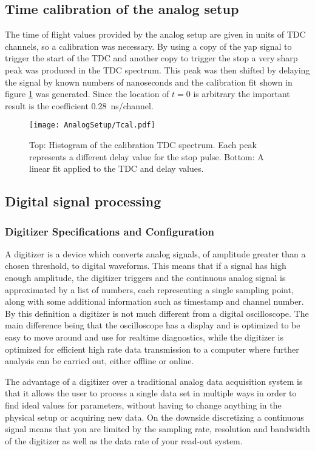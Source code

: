 \documentclass[main.tex]{subfiles}
\begin{document}
\subsection{Time calibration of the analog setup}
The time of flight values provided by the analog setup are given in units of TDC channels, so a calibration was necessary. By using a copy of the yap signal to trigger the start of the TDC and another copy to trigger the stop a very sharp peak was produced in the TDC spectrum.
This peak was then shifted by delaying the signal by known numbers of nanoseconds and the calibration fit shown in figure \ref{fig:Tcal} was generated. Since the location of $t=0$ is arbitrary the important result is the coefficient \SI{0.28}{\nano\second/channel}.
\begin{figure}[ht]
	\centering
    	\texttt{[image: AnalogSetup/Tcal.pdf]}
        \caption{Top: Histogram of the calibration TDC spectrum. Each peak represents a different delay value for the stop pulse. Bottom: A linear fit applied to the TDC and delay values.}
	    \label{fig:Tcal} 
\end{figure}

\subsection{Digital signal processing}
\subsubsection{Digitizer Specifications and Configuration}
A digitizer is a device which converts analog signals, of amplitude greater than a chosen threshold, to digital waveforms. This means that if a signal has high enough amplitude, the digitizer triggers and the continuous analog signal is approximated by a list of numbers, each representing a single sampling point, along with some additional information such as timestamp and channel number. By this definition a digitizer is not much different from a digital oscilloscope. The main difference being that the oscilloscope has a display and is optimized to be easy to move around and use for realtime diagnostics, while the digitizer is optimized for efficient high rate data transmission to a computer where further analysis can be carried out, either offline or online.

The advantage of a digitizer over a traditional analog data acquisition system is that it allows the user to process a single data set in multiple ways in order to find ideal values for parameters, without having to change anything in the physical setup or acquiring new data. On the downside discretizing a continuous signal means that you are limited by the sampling rate, resolution and bandwidth of the digitizer as well as the data rate of your read-out system.
\end{document}
